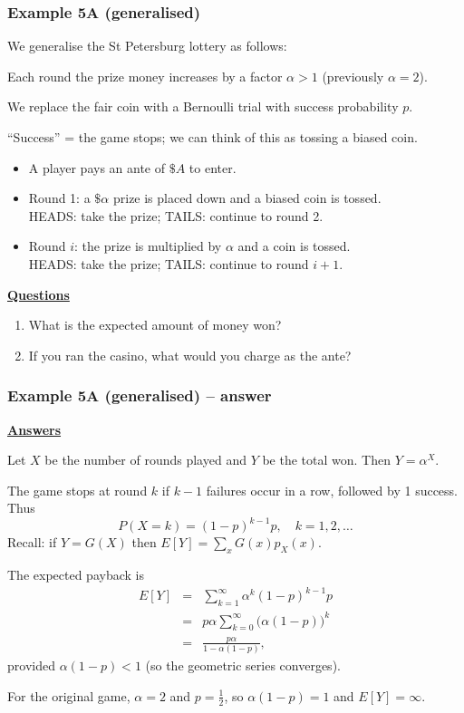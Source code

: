 \documentclass[t,8pt]{beamer}
\begin{document}

\begin{frame}
	\frametitle{Example 5A (generalised)}
	We generalise the St Petersburg lottery as follows: \par
	Each round the prize money increases by a factor $\alpha>1$ (previously $\alpha=2$). \par
	We replace the fair coin with a Bernoulli trial with success probability $p$. \par
	{\small\color{NavyBlue}
		``Success'' = the game stops; we can think of this as tossing a biased coin.
	}
	\begin{itemize}
		\item A player pays an ante of $\$A$ to enter.
		\item Round 1: a $\$\alpha$ prize is placed down and a biased coin is tossed.\\
		HEADS: take the prize; TAILS: continue to round 2.
		\item Round $i$: the prize is multiplied by $\alpha$ and a coin is tossed.\\
		HEADS: take the prize; TAILS: continue to round $i+1$.
	\end{itemize}
	{\bf\underline{Questions}}
	\begin{enumerate}
		\item What is the expected amount of money won?
		\item If you ran the casino, what would you charge as the ante?
	\end{enumerate}
\end{frame}

\begin{frame}
	\frametitle{Example 5A (generalised) – answer}
	{\bf\underline{Answers}} \par
	Let $X$ be the number of rounds played and $Y$ be the total won. Then $Y=\alpha^X$. \par
	The game stops at round $k$ if $k-1$ failures occur in a row, followed by 1 success. Thus
	\[
	P(X=k)=(1-p)^{k-1}p,\quad k=1,2,\dots
	\]
	Recall: if $Y=G(X)$ then $E[Y]=\sum_x G(x)p_X(x)$. \par
	The expected payback is
	\begin{eqnarray*}
		E[Y]
		&=&\sum_{k=1}^{\infty}\alpha^k(1-p)^{k-1}p\\
		&=&p\alpha\sum_{k=0}^{\infty}\big(\alpha(1-p)\big)^k\\
		&=&\frac{p\alpha}{1-\alpha(1-p)},
	\end{eqnarray*}
	provided $\alpha(1-p)<1$ (so the geometric series converges). \par
	{\small\color{NavyBlue}
		For the original game, $\alpha=2$ and $p=\frac12$, so $\alpha(1-p)=1$ and $E[Y]=\infty$.
	}
\end{frame}
\end{document}
